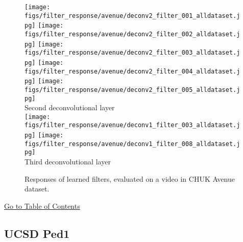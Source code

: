 \documentclass[10pt,twocolumn,letterpaper]{article}
\begin{document}
\begin{figure}[h]
	\texttt{[image: figs/filter\_response/avenue/deconv2\_filter\_001\_alldataset.jpg]}
	\texttt{[image: figs/filter\_response/avenue/deconv2\_filter\_002\_alldataset.jpg]}
	\texttt{[image: figs/filter\_response/avenue/deconv2\_filter\_003\_alldataset.jpg]}
	\texttt{[image: figs/filter\_response/avenue/deconv2\_filter\_004\_alldataset.jpg]}
	\texttt{[image: figs/filter\_response/avenue/deconv2\_filter\_005\_alldataset.jpg]}\\
	{\footnotesize Second deconvolutional layer}\\
	\texttt{[image: figs/filter\_response/avenue/deconv1\_filter\_003\_alldataset.jpg]}
	\texttt{[image: figs/filter\_response/avenue/deconv1\_filter\_008\_alldataset.jpg]}\\
	{\footnotesize Third deconvolutional layer}\\
	\caption{Responses of learned filters, evaluated on a video in CHUK Avenue dataset.}
\end{figure}
\vspace{-5mm}
\begin{center}
	\hyperlink{page.11}{Go to Table of Contents}
\end{center}

\clearpage

\subsection{UCSD Ped1}
\label{sec:filter_res_vis_ped1}
\end{document}
